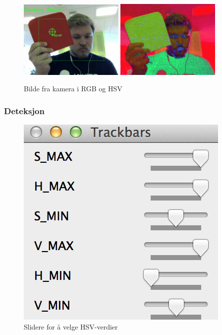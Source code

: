 \begin{figure}[!ht]
	\centering
	{\includegraphics[width=0.45\textwidth]{img/first-rgb.jpg}}
	{\includegraphics[width=0.45\textwidth]{img/first-hsv.jpg}}
	\caption{Bilde fra kamera i RGB og HSV}
\end{figure}
\newpage 
\subsubsection{Deteksjon}

\begin{figure}
	\includegraphics[width=\linewidth]{img/sliders.jpg}
	\caption{Slidere for å velge HSV-verdier}
	\label{fig:sliders}
\end{figure}

